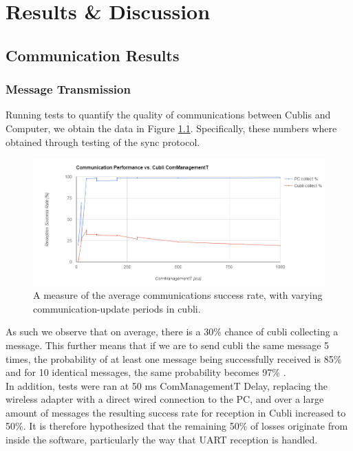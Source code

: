 \chapter{Results \& Discussion}\label{sec:results}

\section{Communication Results}

\subsection{Message Transmission}

Running tests to quantify the quality of communications between Cublis and Computer, we obtain the data in Figure \ref{img:comStats}. Specifically, these numbers where obtained through testing of the sync protocol.

\begin{figure}[ht]
   \centering
   \includegraphics[width=1\textwidth]{img/comStats.png}
   \caption{A measure of the average communications success rate, with varying communication-update periods in cubli.}
   \label{img:comStats}
\end{figure}

As such we observe that on average, there is a 30\% chance of cubli collecting a message. This further means that if we are to send cubli the same message 5 times, the probability of at least one message being successfully received is 85\% and for 10 identical messages, the same probability becomes 97\% .\\

In addition, tests were ran at 50 ms ComManagementT Delay, replacing the wireless adapter with a direct wired connection to the PC, and over a large amount of messages the resulting success rate for reception in Cubli increased to 50\%. It is therefore hypothesized that the remaining 50\% of losses originate from inside the software, particularly the way that UART reception is handled.\\

